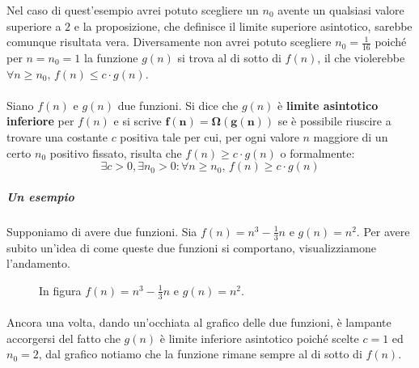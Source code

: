 \documentclass[11pt,a4paper,oneside]{article}
\begin{document}
\begin{tcolorbox}[title=Nota bene]
	Nel caso di quest'esempio avrei potuto scegliere un $n_0$ avente un qualsiasi valore superiore a $2$ e la proposizione, che definisce il limite superiore asintotico, sarebbe comunque risultata vera. Diversamente non avrei potuto scegliere $n_0 = \frac{1}{16}$ poiché per $n = n_0 = 1$ la funzione $g(n)$ si trova al di sotto di $f(n)$, il che violerebbe $\forall n \geq n_0,\,f(n) \leq c\cdot g(n)$.
\end{tcolorbox}
\pagebreak
\paragraph{} Siano $f(n)$ e $g(n)$ due funzioni. Si dice che $g(n)$ è \textbf{limite asintotico inferiore} per $f(n)$ e si scrive $\bm{f(n) = \Omega(g(n))}$ se è possibile riuscire a trovare una costante $c$ positiva tale per cui, per ogni valore $n$ maggiore di un certo $n_0$ positivo fissato, risulta che $f(n) \geq  c\cdot g(n)$ o formalmente: $$\exists c>0, \exists n_0 > 0 : \forall n \geq n_0,\,f(n) \geq c\cdot g(n)$$

\subparagraph*{Un esempio} Supponiamo di avere due funzioni. Sia $f(n) = n^3-\frac{1}{3}n$ e $g(n) = n^2$. Per avere subito un'idea di come queste due funzioni si comportano, visualizziamone l'andamento.

\begin{figure}[hb]
	\centering
	\caption{In figura $f(n) = n^3-\frac{1}{3}n$ e $g(n) = n^2$.}
	\label{fig:asyminf}
\end{figure}
\paragraph*{} Ancora una volta, dando un'occhiata al grafico delle due funzioni, è lampante accorgersi del fatto che $g(n)$ è limite inferiore asintotico poiché scelte $c = 1$ ed $n_0 = 2$, dal grafico notiamo che la funzione rimane sempre al di sotto di $f(n)$.
\pagebreak
\end{document}
